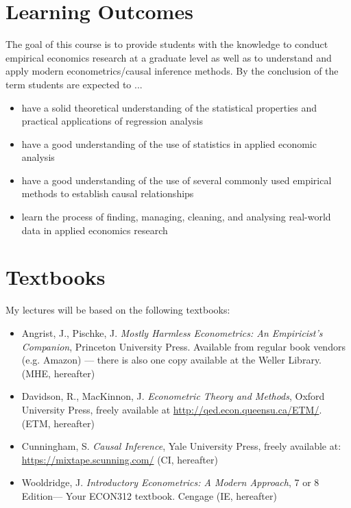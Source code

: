 \documentclass[letterpaper,12pt]{article}
\theoremstyle{dotlessS}
\begin{document}
\section{Learning Outcomes}

The goal of this course is to provide students with the knowledge to conduct empirical economics research at a graduate level as well as to understand and apply modern econometrics/causal inference methods. By the conclusion of the term students are expected to ... 
\begin{itemize}
\item have a solid theoretical understanding of the statistical properties and practical applications of regression analysis
\item have a good understanding of the use of statistics in applied economic analysis
\item have a good understanding of the use of several commonly used empirical methods to establish causal relationships
\item learn the process of finding, managing, cleaning, and analysing real-world data in applied economics research
\end{itemize}

\section{Textbooks}
My lectures will be based on the following textbooks: \\
\begin{itemize}
\item Angrist, J., Pischke, J. \textit{Mostly Harmless Econometrics: An Empiricist's  Companion}, Princeton University Press. Available from regular book vendors (e.g. Amazon) --- there is also one copy available at the Weller Library. (MHE, hereafter)
\item Davidson, R., MacKinnon, J. \textit{Econometric Theory and Methods}, Oxford University Press, freely available at \url{http://qed.econ.queensu.ca/ETM/}. (ETM, hereafter) 
\item Cunningham, S. \textit{Causal Inference}, Yale University Press, freely available at: \url{https://mixtape.scunning.com/}   (CI, hereafter) \\
\item Wooldridge, J. \textit{Introductory Econometrics: A Modern Approach}, 7 or 8 Edition--- Your ECON312 textbook. Cengage (IE, hereafter)
\end{itemize}
\end{document}
